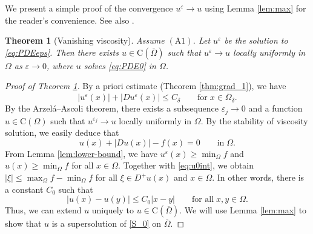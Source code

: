 \documentclass[11pt,reqno]{amsart}
\numberwithin{figure}{section}
\theoremstyle{plain}
\newtheorem{thm}{Theorem}[section]
\theoremstyle{remark}
\numberwithin{equation}{section}
\newcommand{\rmC}{\mathrm{C}}
\begin{document}
We present a simple proof of the convergence $u^\varepsilon \to u$ using Lemma \ref{lem:max} for the reader's convenience. See also \cite[Theorem VII.3]{Capuzzo-Dolcetta1990}.
\begin{thm}[Vanishing viscosity]\label{thm:qual} Assume $\mathrm{(A1)}$. Let $u^\varepsilon$ be the solution to \eqref{eq:PDEeps}. Then there exists $u \in \mathrm{C}(\overline{\Omega})$ such that $u^\varepsilon \rightarrow u$ locally uniformly in $\Omega$ as $\varepsilon\rightarrow 0$, where $u$ solves \eqref{eq:PDE0} in $\Omega$.
\end{thm}

\begin{proof}[Proof of Theorem \ref{thm:qual}] By a priori estimate (Theorem \ref{thm:grad_1}), we have
\begin{equation}\label{e:priorie_eps}
    |u^\varepsilon(x)| + |Du^\varepsilon(x)| \leq C_\delta \qquad\text{for}\;x\in \overline{\Omega}_\delta.
\end{equation}
By the Arzel\'a--Ascoli theorem, there exists a subsequence $\varepsilon_j\to 0$ and a function $u\in \rmC(\Omega)$ such that $u^{\varepsilon_j}\to u$ locally uniformly in $\Omega$. By the stability of viscosity solution, we easily deduce that 
\begin{equation}\label{eq:u0int}
     u(x) + |Du(x)| - f(x) = 0 \qquad\text{in}\;\Omega.
\end{equation}
From Lemma \ref{lem:lower-bound}, we have $  u^\varepsilon(x)\geq \min_{\Omega} f$ and  $  u(x)\geq \min_{\Omega} f$ for all $x\in \Omega$. Together with \eqref{eq:u0int}, we obtain $|\xi|\leq \max_\Omega f - \min_\Omega f$ for all $\xi\in D^+u(x)$ and $x\in \Omega$. In other words, there is a constant $C_0$ such that
\begin{equation}\label{e:C0}
    |u(x) - u(y)| \leq C_0|x-y| \qquad\text{for all}\;x,y\in \Omega.
\end{equation}
Thus, we can extend $u$ uniquely to $u\in \rmC(\overline{\Omega})$. We will use Lemma \ref{lem:max} to show that $u$ is a supersolution of \eqref{S_0} on $\overline{\Omega}$.


\end{proof}
\end{document}
